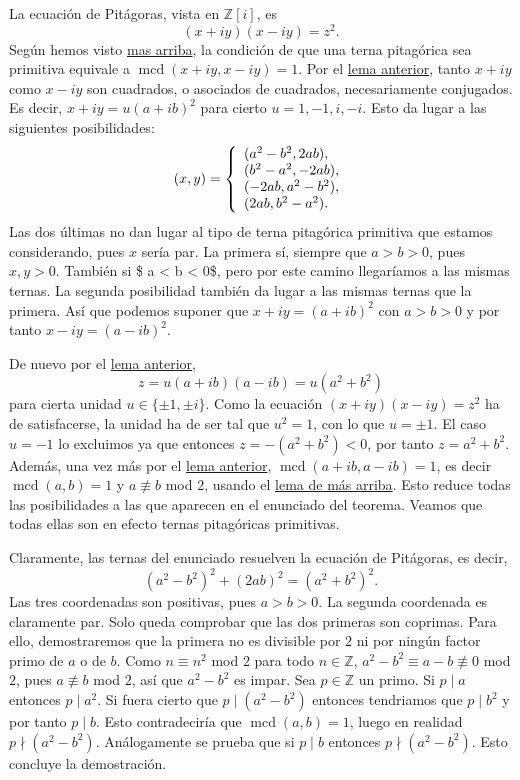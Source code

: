 
La ecuación de Pitágoras, vista en \(\mathbb Z[i]\), es
\[(x+iy)(x-iy)=z^2.\] Según hemos visto
\protect\hyperlink{lem:mcdconj}{mas arriba}, la condición de que una
terna pitagórica sea primitiva equivale a
\(\operatorname{mcd}(x+iy,x-iy)=1\). Por el
\protect\hyperlink{lem:DFU}{lema anterior}, tanto \(x+iy\) como \(x-iy\)
son cuadrados, o asociados de cuadrados, necesariamente conjugados. Es
decir, \(x+iy=u(a+ib)^2\) para cierto \(u=1,-1,i,-i\). Esto da lugar a
las siguientes posibilidades: \[
(x,y)=\left\{\begin{array}{l}
(a^2-b^2,2ab),\cr
(b^2-a^2,-2ab),\cr
(-2ab,a^2-b^2),\cr
(2ab,b^2-a^2).
\end{array}\right.
\] Las dos últimas no dan lugar al tipo de terna pitagórica primitiva
que estamos considerando, pues \(x\) sería par. La primera sí, siempre
que \(a>b>0\), pues \(x,y>0\). También si \$ a \textless{} b \textless{}
0\$, pero por este camino llegaríamos a las mismas ternas. La segunda
posibilidad también da lugar a las mismas ternas que la primera. Así que
podemos suponer que \(x+iy=(a+ib)^2\) con \(a>b>0\) y por tanto
\(x-iy=(a-ib)^2\).

De nuevo por el \protect\hyperlink{lem:DFU}{lema anterior},
\[z=u(a+ib)(a-ib)=u(a^2+b^2)\] para cierta unidad
\(u\in\{\pm1,\pm i\}\). Como la ecuación \((x+iy)(x-iy)=z^2\) ha de
satisfacerse, la unidad ha de ser tal que \(u^2=1\), con lo que
\(u=\pm 1\). El caso \(u=-1\) lo excluimos ya que entonces
\(z=-(a^2+b^2)<0\), por tanto \(z=a^2+b^2\). Además, una vez más por el
\protect\hyperlink{lem:DFU}{lema anterior},
\(\operatorname{mcd}(a+ib,a-ib)=1\), es decir
\(\operatorname{mcd}(a,b)=1\) y \(a\not\equiv b\) mod \(2\), usando el
\protect\hyperlink{lem:mcdconj}{lema de más arriba}. Esto reduce todas
las posibilidades a las que aparecen en el enunciado del teorema. Veamos
que todas ellas son en efecto ternas pitagóricas primitivas.

Claramente, las ternas del enunciado resuelven la ecuación de Pitágoras,
es decir, \[(a^2-b^2)^2+(2ab)^2=(a^2+b^2)^2.\] Las tres coordenadas son
positivas, pues \(a>b>0\). La segunda coordenada es claramente par. Solo
queda comprobar que las dos primeras son coprimas. Para ello,
demostraremos que la primera no es divisible por \(2\) ni por ningún
factor primo de \(a\) o de \(b\). Como \(n\equiv n^2\) mod \(2\) para
todo \(n\in\mathbb{Z}\), \(a^2-b^2\equiv a-b\not\equiv 0\) mod \(2\),
pues \(a\not\equiv b\) mod \(2\), así que \(a^2-b^2\) es impar. Sea
\(p\in\mathbb{Z}\) un primo. Si \(p\mid a\) entonces \(p\mid a^2\). Si
fuera cierto que \(p\mid (a^2-b^2)\) entonces tendriamos que
\(p\mid b^2\) y por tanto \(p\mid b\). Esto contradeciría que
\(\operatorname{mcd}(a,b)=1\), luego en realidad \(p\nmid (a^2-b^2)\).
Análogamente se prueba que si \(p\mid b\) entonces \(p\nmid (a^2-b^2)\).
Esto concluye la demostración. 

